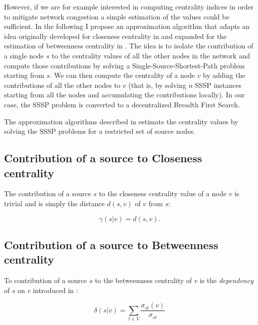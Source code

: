 However, if we are for example interested in computing centrality indices in order to mitigate network congestion a simple estimation of the values could be sufficient. In the following I propose an approximation algorithm that adapts an idea originally developed for closeness centrality in \cite{ew2004} and expanded for the estimation of betweenness centrality in \cite{brandes2007}. The idea is to isolate the contribution of a single node $s$ to the centrality values of all the other nodes in the network and compute those contributions by solving a Single-Source-Shortest-Path problem starting from $s$. We can then compute the centrality of a node $v$ by adding the contributions of all the other nodes to $v$ (that is, by solving $n$ SSSP instances starting from all the nodes and accumulating the contributions locally). In our case, the SSSP problem is converted to a decentralized Breadth First Search.

The approximation algorithms described in \cite{ew2004,brandes2007} estimate the centrality values by solving the SSSP problems for a restricted set of source nodes.

\subsection{Contribution of a source to Closeness centrality}

The contribution of a source $s$ to the closeness centrality value of a node $v$ is trivial and is simply the distance $d(s,v)$ of $v$ from $s$:

\begin{equation}

\gamma(s|v) = d(s,v) .

\end{equation}

\subsection{Contribution of a source to Betweenness centrality}

To contribution of a source $s$ to the betweenness centrality of $v$ is the \emph{dependency} of $s$ on $v$ introduced in \cite{brandes2001}:

\begin{equation}
  
\delta(s|v) = \sum_{t \in V}^{} \frac{\sigma_{st}(v)}{\sigma_{st}}

\end{equation}
